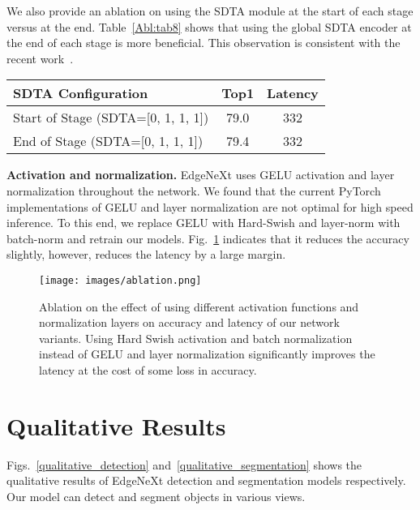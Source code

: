 \documentclass[runningheads]{llncs}
\begin{document}
We also provide an ablation on using the SDTA module at the start of each stage versus at the end. Table~\ref{Abl:tab8} shows that using the global SDTA encoder at the end of each stage is more beneficial. This observation is consistent with the recent work~\cite{li2021improved}.

\begin{SCtable}[\sidecaptionrelwidth][h!]
\begin{tabular}{l|c|c}
\toprule
\rowcolor{Gray} SDTA Configuration & Top1 & Latency  \\
\midrule
Start of Stage (SDTA=[0, 1, 1, 1]) & 79.0 & 332  \\
\rowcolor{orange!6} End of Stage (SDTA=[0, 1, 1, 1]) & 79.4 & 332  \\
\bottomrule 
\end{tabular}
\caption{Ablation on using SDTA at the start and end of each stage in EdgeNeXt. The results show that it is generally beneficial to use SDTA at the end of each stage.}
\label{Abl:tab8}
\end{SCtable}


\noindent\textbf{Activation and normalization.}
EdgeNeXt uses GELU activation and layer normalization throughout the network. We found that the current PyTorch implementations of GELU and layer normalization are not optimal for high speed inference. To this end, we replace GELU with Hard-Swish and layer-norm with batch-norm and retrain our models. Fig.~\ref{Abl:fig3} indicates that it reduces the accuracy slightly, however, reduces the latency by a large margin.

\begin{figure}[!h]
\centering
  \texttt{[image: images/ablation.png]}
  \caption{Ablation on the effect of using different activation functions and normalization layers on accuracy and latency of our network variants. Using Hard Swish activation and batch normalization instead of GELU and layer normalization significantly improves the latency at the cost of some loss in accuracy.}
  \label{Abl:fig3}
\end{figure}

\section{Qualitative Results}
Figs.~\ref{qualitative_detection} and~\ref{qualitative_segmentation} shows the qualitative results of EdgeNeXt detection and segmentation models respectively. Our model can detect and segment objects in various views.   
\end{document}
